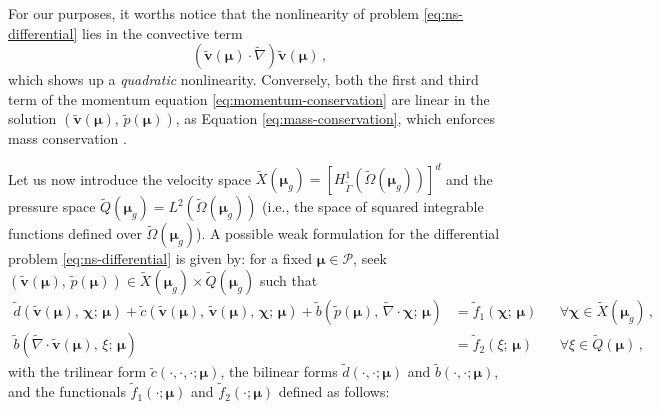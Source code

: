 \documentclass[12pt, a4paper, twoside, openright]{report}
\numberwithin{equation}{chapter}
\theoremstyle{theorem}
\theoremstyle{definition}
\theoremstyle{remark}
\theoremstyle{proposition}
\numberwithin{figure}{chapter}
\newcommand{\wt}[1]{\widetilde{#1}}
\newcommand{\bg}[1]{\boldsymbol{#1}}
\begin{document}
		For our purposes, it worths notice that the nonlinearity of problem \eqref{eq:ns-differential} lies in the convective term
		\begin{equation*}
			(\wt{\bg{v}}(\bg{\mu}) \cdot \wt{\nabla}) \wt{\bg{v}}(\bg{\mu}) \, ,
		\end{equation*}
		which shows up a \emph{quadratic} nonlinearity. Conversely, both the first and third term of the momentum equation \eqref{eq:momentum-conservation} are linear in the solution $(\wt{\bg{v}}(\bg{\mu}), \, \wt{p}(\bg{\mu}))$, as Equation \eqref{eq:mass-conservation}, which enforces mass conservation \cite{QMN15}.
		
		Let us now introduce the velocity space $\wt{X}(\bg{\mu}_g) = [ H^1_{\wt{\Gamma}}(\wt{\Omega}(\bg{\mu}_g)) ]^d$ and the pressure space $\wt{Q}(\bg{\mu}_g) = L^2(\wt{\Omega}(\bg{\mu}_g))$ (i.e., the space of squared integrable functions defined over $\wt{\Omega}(\bg{\mu}_g)$). A possible weak formulation for the differential problem \eqref{eq:ns-differential} is given by: for a fixed $\bg{\mu} \in \mathcal{P}$, seek $(\wt{\bg{v}}(\bg{\mu}), \, \wt{p}(\bg{\mu})) \in \wt{X}(\bg{\mu}_g) \times \wt{Q}(\bg{\mu}_g)$ such that
		\begin{subequations}
			\label{eq:ns-weak}
			\begin{align}
				\label{eq:ns-weak-velocity}
				\wt{d}(\wt{\bg{v}}(\bg{\mu}), \, \bg{\chi}; \, \bg{\mu}) + \wt{c}(\wt{\bg{v}}(\bg{\mu}), \, \wt{\bg{v}}(\bg{\mu}), \, \bg{\chi}; \, \bg{\mu}) + \wt{b}(\wt{p}(\bg{\mu}), \, \wt{\nabla} \cdot \bg{\chi}; \, \bg{\mu}) & = \wt{f}_1(\bg{\chi}; \, \bg{\mu}) && \forall \bg{\chi} \in \wt{X}(\bg{\mu}_g) \, , \\
				\label{eq:ns-weak-pressure}
				\wt{b}(\wt{\nabla} \cdot \wt{\bg{v}}(\bg{\mu}), \, \xi; \, \bg{\mu}) & = \wt{f}_2(\xi; \, \bg{\mu}) && \forall \xi \in \wt{Q}(\bg{\mu}) \, ,
			\end{align}
		\end{subequations}
		with the trilinear form $\wt{c}(\cdot, \cdot, \cdot; \bg{\mu})$, the bilinear forms $\wt{d}(\cdot, \cdot; \bg{\mu})$ and $\wt{b}(\cdot, \cdot; \bg{\mu})$, and the functionals $\wt{f}_1(\cdot; \bg{\mu})$ and $\wt{f}_2(\cdot; \bg{\mu})$ defined as follows:
\end{document}

